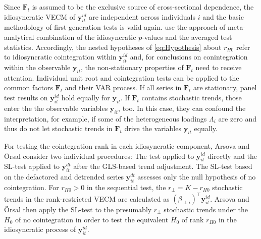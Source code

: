 Since $ \boldsymbol{F}_t $ is assumed to be the exclusive source of cross-sectional dependence, the idiosyncratic VECM of $ \boldsymbol{y}^{i \! d}_{it} $ are independent across individuals $ i $ and the basic methodology of first-generation tests is valid again. \citet{ArsovaOersal2017} use the approach of meta-analytical combination of the idiosyncratic $p$-values and \citet{ArsovaOersal2018} the averaged test statistics. Accordingly, the nested hypotheses of \eqref{eq:Hypothesis} about $ r_{H0} $ refer to idiosyncratic cointegration within $ \boldsymbol{y}^{i \! d}_{it} $ and, for conclusions on conintegration within the observable $ \boldsymbol{y}_{it} $, the non-stationary properties of $ \boldsymbol{F}_t $ need to receive attention. Individual unit root and cointegration tests can be applied to the common factors $ \boldsymbol{F}_t $ and their VAR process. If all series in $ \boldsymbol{F}_t $ are stationary, panel test results on $ \boldsymbol{y}^{i \! d}_{it} $ hold equally for $ \boldsymbol{y}_{it} $. If $ \boldsymbol{F}_t $ contains stochastic trends, those enter the the observable variables $ \boldsymbol{y}_{it} $, too. In this case, they can confound the interpretation, for example, if some of the heterogeneous loadings $ \Lambda_i $ are zero and thus do not let stochastic trends in $ \boldsymbol{F}_t $ drive the variables $ \boldsymbol{y}_{it} $ equally.

For testing the cointegration rank in each idiosyncratic component, Arsova and Örsal \citeyearpar{ArsovaOersal2017,ArsovaOersal2018} consider two individual procedures: The \citeauthor{Johansen1988} test applied to $ \boldsymbol{y}^{i \! d}_{it} $ directly and the SL-test applied to $ \boldsymbol{y}^{d \! t}_{it} $ after the GLS-based trend adjustment. The SL-test based on the defactored and detrended series $ \boldsymbol{y}^{d \! t}_{it} $ assesses only the null hypothesis of no cointegration. For $ r_{H0} > 0 $ in the sequential test, the $ r_\perp = K - r_{H0} $ stochastic trends in the rank-restricted VECM are calculated as $ \left( \beta_{\perp i} \right)^\top \boldsymbol{y}^{i \! d}_{it} $. Arsova and Örsal \citeyearpar{ArsovaOersal2017,ArsovaOersal2018} then apply the SL-test to the presumably $ r_\perp $ stochastic trends under the $ H_0 $ of no cointegration in order to test the equivalent $ H_0 $ of rank $ r_{H0} $ in the idiosyncratic process of $ \boldsymbol{y}^{i \! d}_{it} $. 

